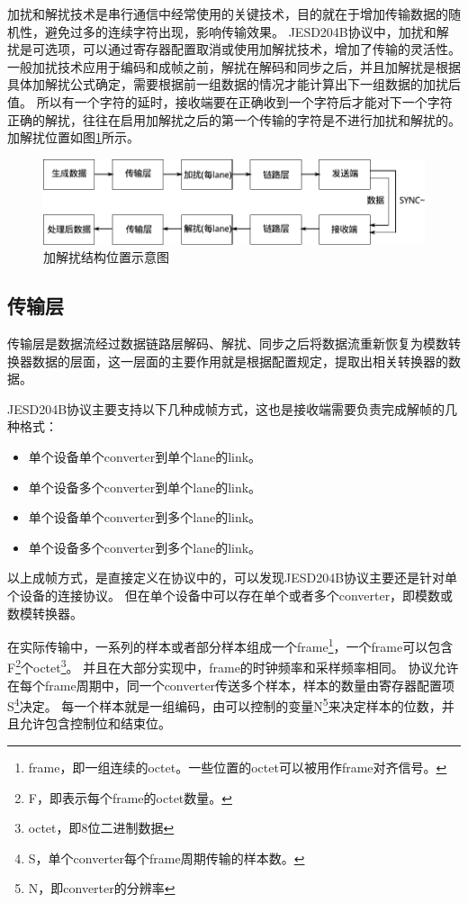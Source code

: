 \documentclass[UTF8]{ctexart}
\begin{document}
加扰和解扰技术是串行通信中经常使用的关键技术，目的就在于增加传输数据的随机性，避免过多的连续字符出现，影响传输效果。
JESD204B协议中，加扰和解扰是可选项，可以通过寄存器配置取消或使用加解扰技术，增加了传输的灵活性。
一般加扰技术应用于编码和成帧之前，解扰在解码和同步之后，并且加解扰是根据具体加解扰公式确定，需要根据前一组数据的情况才能计算出下一组数据的加扰后值。
所以有一个字符的延时，接收端要在正确收到一个字符后才能对下一个字符正确的解扰，往往在启用加解扰之后的第一个传输的字符是不进行加扰和解扰的。
加解扰位置如图\ref{fig:functional_location_of_scrambler_and_descrambler}所示。

\begin{figure}[H]
\centering
\includegraphics[width=15cm]{./img/functional_location_of_scrambler_and_descrambler.pdf}
\caption{加解扰结构位置示意图}
\label{fig:functional_location_of_scrambler_and_descrambler}
\end{figure}

\subsection{传输层}

传输层是数据流经过数据链路层解码、解扰、同步之后将数据流重新恢复为模数转换器数据的层面，这一层面的主要作用就是根据配置规定，提取出相关转换器的数据。

JESD204B协议主要支持以下几种成帧方式，这也是接收端需要负责完成解帧的几种格式：

\begin{itemize}
\item 单个设备单个converter到单个lane的link。
\item 单个设备多个converter到单个lane的link。
\item 单个设备单个converter到多个lane的link。
\item 单个设备多个converter到多个lane的link。
\end{itemize}

以上成帧方式，是直接定义在协议中的，可以发现JESD204B协议主要还是针对单个设备的连接协议。
但在单个设备中可以存在单个或者多个converter，即模数或数模转换器。

在实际传输中，一系列的样本或者部分样本组成一个frame\footnote{frame，即一组连续的octet。一些位置的octet可以被用作frame对齐信号。}，一个frame可以包含F\footnote{F，即表示每个frame的octet数量。}个octet\footnote{octet，即8位二进制数据}。
并且在大部分实现中，frame的时钟频率和采样频率相同。
协议允许在每个frame周期中，同一个converter传送多个样本，样本的数量由寄存器配置项S\footnote{S，单个converter每个frame周期传输的样本数。}决定。
每一个样本就是一组编码，由可以控制的变量N\footnote{N，即converter的分辨率}来决定样本的位数，并且允许包含控制位和结束位。
\end{document}
